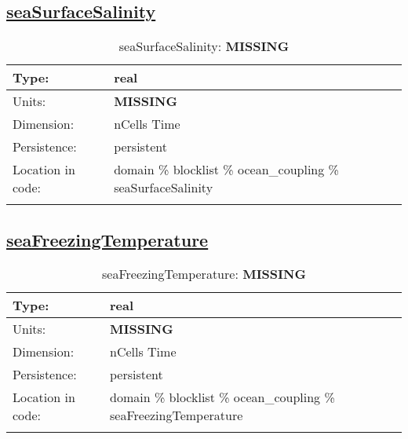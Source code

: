 \subsection[seaSurfaceSalinity]{\hyperref[sec:var_tab_ocean_coupling]{seaSurfaceSalinity}}
\label{subsec:var_sec_ocean_coupling_seaSurfaceSalinity}
\begin{center}
\begin{longtable}{| p{2.0in} | p{4.0in} |}
        \hline 
        Type: & real \\
        \hline 
        Units: & {\bf \color{red} MISSING} \\
        \hline 
        Dimension: & nCells Time \\
        \hline 
        Persistence: & persistent \\
        \hline 
         Location in code: & domain \% blocklist \% ocean\_coupling \% seaSurfaceSalinity \\
         \hline 
    \caption{seaSurfaceSalinity: {\bf \color{red} MISSING}}
\end{longtable}
\end{center}
\subsection[seaFreezingTemperature]{\hyperref[sec:var_tab_ocean_coupling]{seaFreezingTemperature}}
\label{subsec:var_sec_ocean_coupling_seaFreezingTemperature}
\begin{center}
\begin{longtable}{| p{2.0in} | p{4.0in} |}
        \hline 
        Type: & real \\
        \hline 
        Units: & {\bf \color{red} MISSING} \\
        \hline 
        Dimension: & nCells Time \\
        \hline 
        Persistence: & persistent \\
        \hline 
         Location in code: & domain \% blocklist \% ocean\_coupling \% seaFreezingTemperature \\
         \hline 
    \caption{seaFreezingTemperature: {\bf \color{red} MISSING}}
\end{longtable}
\end{center}
